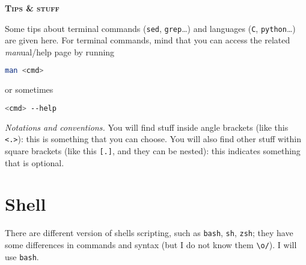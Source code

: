 \documentclass[a4paper,12pt,%
              final%
              ]{article}
\begin{document}
\begin{center}
\bfseries \scshape \Huge \color{BlueX}%
Tips \& stuff
\end{center}
%
\vspace*{\baselineskip}

Some tips about terminal commands (\texttt{sed}, \texttt{grep}\ldots) and languages (\texttt{C}, \texttt{python}\ldots) are given here. For terminal commands, mind that you can access the related \emph{man}ual/help page by running
\begin{lstlisting}[language=bash]
man <cmd>
\end{lstlisting}
or sometimes
\begin{lstlisting}[language=bash]
<cmd> --help
\end{lstlisting}

\emph{Notations and conventions.} You will find stuff inside angle brackets (like this \verb|<.>|): this is something that you can choose. You will also find other stuff within square brackets (like this \verb|[.]|, and they can be nested): this indicates something that is optional.

\section{Shell}
\label{sec:shell}
There are different version of shells scripting, such as \texttt{bash}, \texttt{sh}, \texttt{zsh}; they have some differences in commands and syntax (but I do not know them \verb|\o/|). I will use \texttt{bash}.
\end{document}

